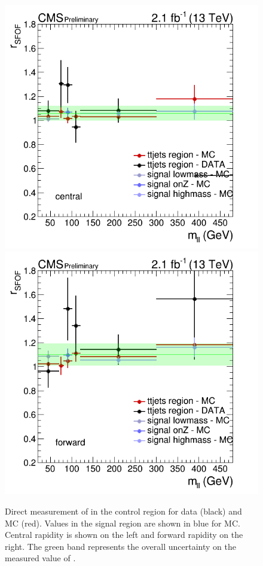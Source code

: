 \begin{figure}[htb]
  \begin{center}
    \includegraphics[scale=0.35]{bkgd/figs/plot_rsfof_mll_central.png}
    \includegraphics[scale=0.35]{bkgd/figs/plot_rsfof_mll_forward.png}
    \caption{
      Direct measurement of \rsfof in the control region for data (black) and \ttbar MC (red).
      Values in the signal region are shown in blue for \ttbar MC. Central rapidity is shown on the left and forward rapidity on the right.
      The green band represents the overall uncertainty on the measured value of \rsfof.
    }
    \label{fig:rsfof}
  \end{center}
\end{figure}

